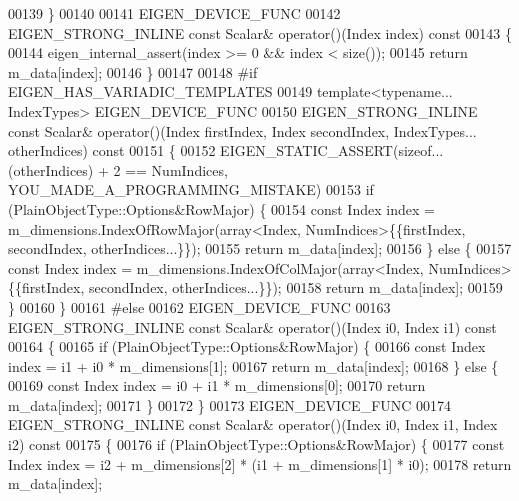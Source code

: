 \begin{DoxyCode}
00139     \}
00140 
00141     EIGEN\_DEVICE\_FUNC
00142     EIGEN\_STRONG\_INLINE \textcolor{keyword}{const} Scalar& operator()(Index index)\textcolor{keyword}{ const}
00143 \textcolor{keyword}{    }\{
00144       eigen\_internal\_assert(index >= 0 && index < size());
00145       \textcolor{keywordflow}{return} m\_data[index];
00146     \}
00147 
00148 \textcolor{preprocessor}{#if EIGEN\_HAS\_VARIADIC\_TEMPLATES}
00149     \textcolor{keyword}{template}<\textcolor{keyword}{typename}... IndexTypes> EIGEN\_DEVICE\_FUNC
00150     EIGEN\_STRONG\_INLINE \textcolor{keyword}{const} Scalar& operator()(Index firstIndex, Index secondIndex, IndexTypes... 
      otherIndices)\textcolor{keyword}{ const}
00151 \textcolor{keyword}{    }\{
00152       EIGEN\_STATIC\_ASSERT(\textcolor{keyword}{sizeof}...(otherIndices) + 2 == NumIndices, YOU\_MADE\_A\_PROGRAMMING\_MISTAKE)
00153       \textcolor{keywordflow}{if} (PlainObjectType::Options&RowMajor) \{
00154         \textcolor{keyword}{const} Index index = m\_dimensions.IndexOfRowMajor(array<Index, NumIndices>\{\{firstIndex, secondIndex,
       otherIndices...\}\});
00155         \textcolor{keywordflow}{return} m\_data[index];
00156       \} \textcolor{keywordflow}{else} \{
00157         \textcolor{keyword}{const} Index index = m\_dimensions.IndexOfColMajor(array<Index, NumIndices>\{\{firstIndex, secondIndex,
       otherIndices...\}\});
00158         \textcolor{keywordflow}{return} m\_data[index];
00159       \}
00160     \}
00161 \textcolor{preprocessor}{#else}
00162     EIGEN\_DEVICE\_FUNC
00163     EIGEN\_STRONG\_INLINE \textcolor{keyword}{const} Scalar& operator()(Index i0, Index i1)\textcolor{keyword}{ const}
00164 \textcolor{keyword}{    }\{
00165       \textcolor{keywordflow}{if} (PlainObjectType::Options&RowMajor) \{
00166         \textcolor{keyword}{const} Index index = i1 + i0 * m\_dimensions[1];
00167         \textcolor{keywordflow}{return} m\_data[index];
00168       \} \textcolor{keywordflow}{else} \{
00169         \textcolor{keyword}{const} Index index = i0 + i1 * m\_dimensions[0];
00170         \textcolor{keywordflow}{return} m\_data[index];
00171       \}
00172     \}
00173     EIGEN\_DEVICE\_FUNC
00174     EIGEN\_STRONG\_INLINE \textcolor{keyword}{const} Scalar& operator()(Index i0, Index i1, Index i2)\textcolor{keyword}{ const}
00175 \textcolor{keyword}{    }\{
00176       \textcolor{keywordflow}{if} (PlainObjectType::Options&RowMajor) \{
00177          \textcolor{keyword}{const} Index index = i2 + m\_dimensions[2] * (i1 + m\_dimensions[1] * i0);
00178          \textcolor{keywordflow}{return} m\_data[index];

\end{DoxyCode}
